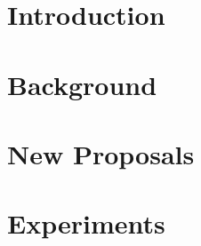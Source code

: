 \documentclass[ twoside,openright,titlepage,numbers=noenddot,headinclude,%
                footinclude=true,cleardoublepage=empty,abstractoff, %
                BCOR=5mm,paper=a4,fontsize=11pt,%
                american,%
                ]{scrreprt}
\begin{document}
	\frenchspacing
	\raggedbottom
	\pagestyle{plain}
	
	
	
	\cleardoublepage
	\cleardoublepage
	\cleardoublepage
	\cleardoublepage
	\cleardoublepage
	\cleardoublepage
	\pagestyle{scrheadings}
	\cleardoublepage
	\part{Introduction}\label{pt:introduction}
	
	\part{Background}\label{pt:background}
	
	
	\part{New Proposals}\label{pt:NewProposals}
	
	\part{Experiments}\label{pt:Experiments}
	
	
	



	\cleardoublepage
	\cleardoublepage
	\cleardoublepage
\end{document}

